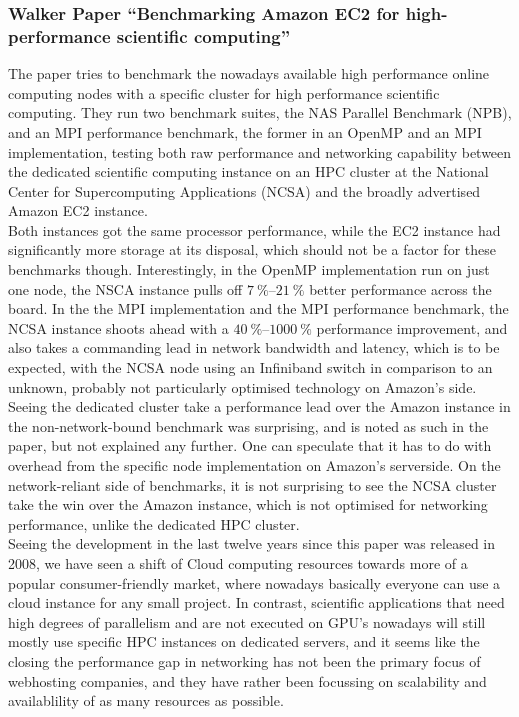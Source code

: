 \documentclass[]{scrartcl}
\begin{document}
\subsubsection{Walker Paper ``Benchmarking Amazon EC2 for high-performance scientific computing''}
The paper tries to benchmark the nowadays available high performance online computing nodes with a specific cluster for high performance scientific computing. They run two benchmark suites, the NAS Parallel Benchmark (NPB), and an MPI performance benchmark, the former in an OpenMP and an MPI implementation, testing both raw performance and networking capability between the dedicated scientific computing instance on an HPC cluster at the National Center for Supercomputing Applications (NCSA) and the broadly advertised Amazon EC2 instance.
\\
Both instances got the same processor performance, while the EC2 instance had significantly more storage at its disposal, which should not be a factor for these benchmarks though. Interestingly, in the OpenMP implementation run on just one node, the NSCA instance pulls off $ \SIrange[range-phrase = -]{7}{21}{\percent} $ better performance across the board. In the the MPI implementation and the MPI performance benchmark, the NCSA instance shoots ahead with a $ \SIrange[range-phrase = -]{40}{1000}{\percent} $ performance improvement, and also takes a commanding lead in network bandwidth and latency, which is to be expected, with the NCSA node using an Infiniband switch in comparison to an unknown, probably not particularly optimised technology on Amazon's side.
\\
Seeing the dedicated cluster take a performance lead over the Amazon instance in the non-network-bound benchmark was surprising, and is noted as such in the paper, but not explained any further. One can speculate that it has to do with overhead from the specific node implementation on Amazon's serverside. On the network-reliant side of benchmarks, it is not surprising to see the NCSA cluster take the win over the Amazon instance, which is not optimised for networking performance, unlike the dedicated HPC cluster.
\\
Seeing the development in the last twelve years since this paper was released in 2008, we have seen a shift of Cloud computing resources towards more of a popular consumer-friendly market, where nowadays basically everyone can use a cloud instance for any small project. In contrast, scientific applications that need high degrees of parallelism and are not executed on GPU's nowadays will still mostly use specific HPC instances on dedicated servers, and it seems like the closing the performance gap in networking has not been the primary focus of webhosting companies, and they have rather been focussing on scalability and availablility of as many resources as possible.
\end{document}
